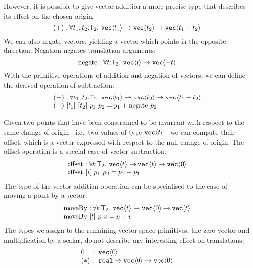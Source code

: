 However, it is possible to give vector addition a more precise type
that describes its effect on the chosen origin. 
\begin{displaymath}
  (+) : \forall t_1, t_2 \mathord: \SynTransl_2.\ \tyPrim{vec}{t_1} \to \tyPrim{vec}{t_2} \to \tyPrim{vec}{t_1 + t_2}
\end{displaymath}
We can also negate vectors, yielding a vector which points in the
opposite direction. Negation negates translation arguments:
\begin{displaymath}
  \mathrm{negate} : \forall t \mathord: \mathsf{T}_2.\ \texttt{vec}\langle t \rangle \to \texttt{vec}\langle -t \rangle
\end{displaymath}
With the primitive operations of addition and negation of vectors, we
can define the derived operation of subtraction:
\begin{displaymath}
  \begin{array}{l}
    (-) : \forall t_1,t_2 \mathord:\mathsf{T}_2.\ \texttt{vec}\langle t_1 \rangle \to \texttt{vec}\langle t_2 \rangle \to \texttt{vec}\langle t_1 - t_2 \rangle \\
    (-)\ [t_1]\ [t_2]\ p_1\ p_2 = p_1 + \mathrm{negate}\ p_2
  \end{array}
\end{displaymath}

Given two points that have been constrained to be invariant with
respect to the same change of origin---i.e.~two values of type
$\texttt{vec}\langle t \rangle$---we can compute their offset, which is a vector
expressed with respect to the null change of origin. The offset
operation is a special case of vector subtraction:
\begin{displaymath}
  \begin{array}{l}
    \mathrm{offset} : \forall t \mathord:\mathsf{T}_2.\ \texttt{vec}\langle t \rangle \to \texttt{vec}\langle t \rangle \to \texttt{vec}\langle 0 \rangle \\
    \mathrm{offset}\ [t]\ p_1\ p_2 = p_1 - p_2
  \end{array}
\end{displaymath}
The type of the vector addition operation can be specialised to the
case of moving a point by a vector:
\begin{displaymath}
  \begin{array}{l}
    \mathrm{moveBy} : \forall t \mathord:\mathsf{T}_2.\ \texttt{vec}\langle t \rangle \to \texttt{vec}\langle 0 \rangle \to \texttt{vec}\langle t \rangle \\
    \mathrm{moveBy}\ [t]\ p\ v = p + v
  \end{array}
\end{displaymath}
The types we assign to the remaining vector space primitives, the zero
vector and multiplication by a scalar, do not describe any interesting
effect on translations:
\begin{displaymath}
  \begin{array}{l@{\hspace{0.5em}:\hspace{0.5em}}l}
    \mathrm{0} & \tyPrim{vec}{0}\\
    (*) & \tyPrimNm{real} \to \tyPrim{vec}{0} \to \tyPrim{vec}{0}
  \end{array}
\end{displaymath}

